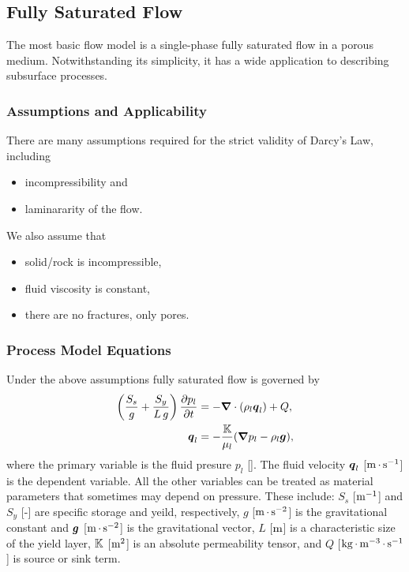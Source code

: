 \subsection{Fully Saturated Flow}
\label{sec:flow-single-phase}

The most basic flow model is a single-phase fully saturated flow in a porous medium.  
Notwithstanding its simplicity, it has a wide application to
describing subsurface processes.


\subsubsection{Assumptions and Applicability}

There are many assumptions required for the strict validity of Darcy's Law, 
including 
\begin{itemize}
\item
  incompressibility and 
\item
  laminararity of the flow.
\end{itemize}
We also assume that 
\begin{itemize}
\item
  solid/rock is incompressible,
\item 
  fluid viscosity is constant,
\item
  there are no fractures, only pores.
\end{itemize}

\subsubsection{Process Model Equations}

Under the above assumptions fully saturated flow is governed by 
\begin{subequations}
\label{eq:Darcy fully saturated}
\begin{align}
  \left(\displaystyle \frac{S_s}{g} + \displaystyle \frac{S_y}{L\,g}\right) \frac{\partial p_l}{\partial t} 
  &=
  -\boldsymbol{\nabla} \cdot (\rho_l \boldsymbol{q}_l) + Q,
  \\
  {\boldsymbol{q}}_l &= -\frac{{\mathbb K}}{\mu_l} 
  ({\boldsymbol{\nabla}} p_l - \rho_l {\boldsymbol{g}}),
\end{align}
\end{subequations}
where the primary variable is the fluid presure $p_l$ [\upa]. 
The fluid velocity ${\boldsymbol{q}}_l$ [${\rm m}{\,\cdot\,}{\rm s}^{-1}$] is the dependent variable.
All the other variables can be treated as material parameters
that sometimes may depend on pressure.
These include:
$S_s$ [${\rm m}^{-1}$] and $S_y$ [-] are specific storage and yeild, respectively,
$g$ [${\rm m}{\,\cdot\,}{\rm s}^{-2}$] is the gravitational constant
and ${\boldsymbol{g}}$ [${\rm m}{\,\cdot\,}{\rm s}^{-2}$] is the gravitational vector,  
$L$ [${\rm m}$] is a characteristic size of the yield layer, 
${\mathbb K}$ [${\rm m}^2$] is an absolute permeability tensor, and 
$Q$ [${\rm kg} {\,\cdot\,} {\rm m}^{-3} {\,\cdot\,} {\rm s}^{-1}$] is source or sink term.
 

